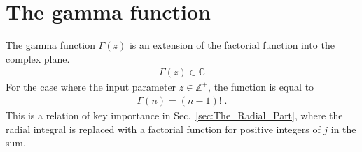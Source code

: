     \section{The gamma function} \label{sec:Gamma_Function}
        The gamma function $\Gamma(z)$ is an extension of the factorial function into the complex plane. 
        \begin{align}
            \Gamma(z) \in \mathbb{C} 
        \end{align}
        For the case where the input parameter $z \in \mathbb{Z}^+$, the function is equal to \cite{Arfken_Weber_Arfken_Weber_2008}
        \begin{align}
            \Gamma(n) = (n - 1)!\;.
        \end{align}
        \noindent This is a relation of key importance in Sec.~\ref{sec:The_Radial_Part}, where the radial integral is replaced with a factorial function for positive integers of $j$ in the sum.\\

